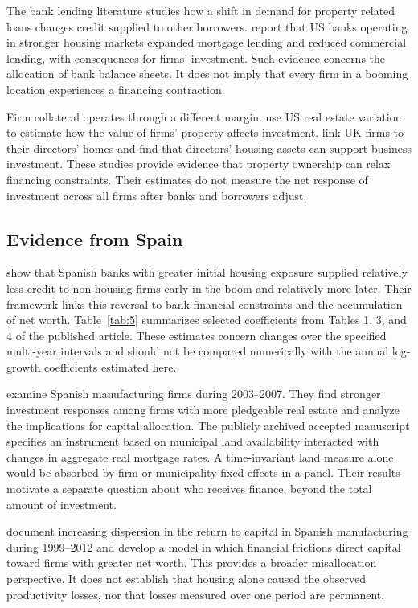\documentclass[11pt,letterpaper]{article}
\begin{document}
The bank lending literature studies how a shift in demand for property related loans changes credit supplied to other borrowers. \citet*{chakraborty2018} report that US banks operating in stronger housing markets expanded mortgage lending and reduced commercial lending, with consequences for firms' investment. Such evidence concerns the allocation of bank balance sheets. It does not imply that every firm in a booming location experiences a financing contraction.


Firm collateral operates through a different margin. \citet*{chaney2012} use US real estate variation to estimate how the value of firms' property affects investment. \citet*{bahaj2020} link UK firms to their directors' homes and find that directors' housing assets can support business investment. These studies provide evidence that property ownership can relax financing constraints. Their estimates do not measure the net response of investment across all firms after banks and borrowers adjust.


\subsection{Evidence from Spain}

\citet*{martin2021} show that Spanish banks with greater initial housing exposure supplied relatively less credit to non-housing firms early in the boom and relatively more later. Their framework links this reversal to bank financial constraints and the accumulation of net worth. Table~\ref{tab:5} summarizes selected coefficients from Tables 1, 3, and 4 of the published article. These estimates concern changes over the specified multi-year intervals and should not be compared numerically with the annual log-growth coefficients estimated here.


\citet*{basco2025} examine Spanish manufacturing firms during 2003--2007. They find stronger investment responses among firms with more pledgeable real estate and analyze the implications for capital allocation. The publicly archived accepted manuscript specifies an instrument based on municipal land availability interacted with changes in aggregate real mortgage rates. A time-invariant land measure alone would be absorbed by firm or municipality fixed effects in a panel. Their results motivate a separate question about who receives finance, beyond the total amount of investment.


\citet{gopinath2017} document increasing dispersion in the return to capital in Spanish manufacturing during 1999--2012 and develop a model in which financial frictions direct capital toward firms with greater net worth. This provides a broader misallocation perspective. It does not establish that housing alone caused the observed productivity losses, nor that losses measured over one period are permanent.
\end{document}
